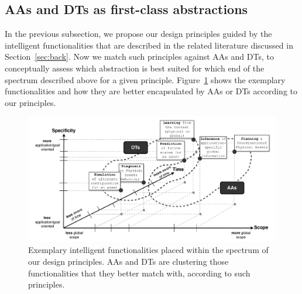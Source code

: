 \subsection{AAs and DTs as first-class abstractions}
\label{ssec:abs-def}


In the previous subsection, we propose our design principles guided by the intelligent functionalities that are described in the related literature discussed in Section~\ref{sec:back}. 
Now we match such principles against AAs and DTs, to conceptually assess which abstraction is best suited for which end of the spectrum described above for a given principle. 
Figure~\ref{fig:principles} shows the exemplary functionalities and how they are better encapsulated by AAs or DTs according to our principles. 

\begin{figure}[!t]
    \centering
    \includegraphics[width=\columnwidth]{figures/dt-mas/principles-aa-dt.pdf}
    \caption{Exemplary intelligent functionalities placed within the spectrum of our design principles. AAs and DTs are clustering those functionalities that they better match with, according to such principles.}
    \label{fig:principles}
\end{figure}

